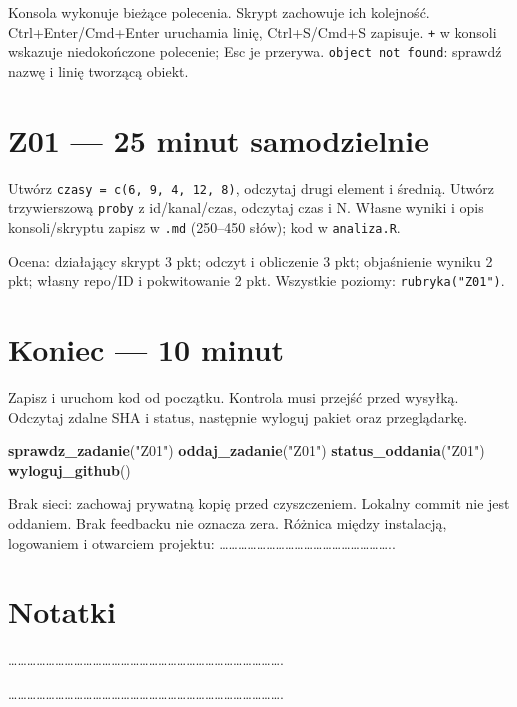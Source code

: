 \documentclass[
  polish,
  11pt,
  a4paper,
]{article}
\newenvironment{Shaded}{\begin{snugshade}}{\end{snugshade}}
\newcommand{\FunctionTok}[1]{\textcolor[rgb]{0.13,0.29,0.53}{\textbf{#1}}}
\newcommand{\NormalTok}[1]{#1}
\newcommand{\StringTok}[1]{\textcolor[rgb]{0.31,0.60,0.02}{#1}}
\begin{document}
Konsola wykonuje bieżące polecenia. Skrypt zachowuje ich kolejność.
Ctrl+Enter/Cmd+Enter uruchamia linię, Ctrl+S/Cmd+S zapisuje. \texttt{+}
w konsoli wskazuje niedokończone polecenie; Esc je przerywa.
\texttt{object\ not\ found}: sprawdź nazwę i linię tworzącą obiekt.

\section{Z01 --- 25 minut samodzielnie}\label{z01-25-minut-samodzielnie}

Utwórz \texttt{czasy\ =\ c(6,\ 9,\ 4,\ 12,\ 8)}, odczytaj drugi element
i średnią. Utwórz trzywierszową \texttt{proby} z id/kanal/czas, odczytaj
czas i N. Własne wyniki i opis konsoli/skryptu zapisz w \texttt{.md}
(250--450 słów); kod w \texttt{analiza.R}.

Ocena: działający skrypt 3 pkt; odczyt i obliczenie 3 pkt; objaśnienie
wyniku 2 pkt; własny repo/ID i pokwitowanie 2 pkt. Wszystkie poziomy:
\texttt{rubryka("Z01")}.

\section{Koniec --- 10 minut}\label{koniec-10-minut}

Zapisz i uruchom kod od początku. Kontrola musi przejść przed wysyłką.
Odczytaj zdalne SHA i status, następnie wyloguj pakiet oraz
przeglądarkę.

\begin{Shaded}
\begin{Highlighting}[]
\FunctionTok{sprawdz\_zadanie}\NormalTok{(}\StringTok{"Z01"}\NormalTok{)}
\FunctionTok{oddaj\_zadanie}\NormalTok{(}\StringTok{"Z01"}\NormalTok{)}
\FunctionTok{status\_oddania}\NormalTok{(}\StringTok{"Z01"}\NormalTok{)}
\FunctionTok{wyloguj\_github}\NormalTok{()}
\end{Highlighting}
\end{Shaded}

Brak sieci: zachowaj prywatną kopię przed czyszczeniem. Lokalny commit
nie jest oddaniem. Brak feedbacku nie oznacza zera. Różnica między
instalacją, logowaniem i otwarciem projektu:
\ldots\ldots\ldots\ldots\ldots\ldots\ldots\ldots\ldots\ldots\ldots\ldots\ldots\ldots\ldots\ldots\ldots\ldots..

\section{Notatki}\label{notatki}

\ldots\ldots\ldots\ldots\ldots\ldots\ldots\ldots\ldots\ldots\ldots\ldots\ldots\ldots\ldots\ldots\ldots\ldots\ldots\ldots\ldots\ldots\ldots\ldots\ldots\ldots\ldots\ldots\ldots.

\ldots\ldots\ldots\ldots\ldots\ldots\ldots\ldots\ldots\ldots\ldots\ldots\ldots\ldots\ldots\ldots\ldots\ldots\ldots\ldots\ldots\ldots\ldots\ldots\ldots\ldots\ldots\ldots\ldots.
\end{document}
